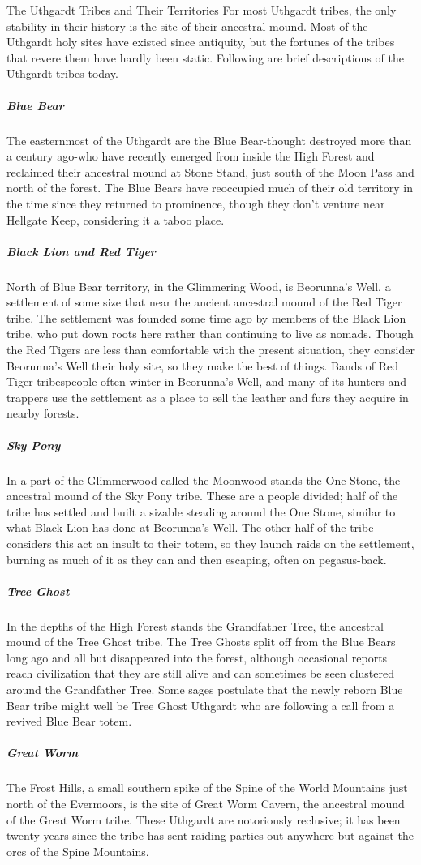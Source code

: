\documentclass[10pt,a4paper,twoside,twocolumn,openany,bg=print,nodeprecatedcode]{dndbook}
\begin{document}
\begin{DndComment}{The Uthgardt Tribes and Their Territories}
For most Uthgardt tribes, the only stability in their history is the site of their ancestral mound. Most of the Uthgardt holy sites have existed since antiquity, but the fortunes of the tribes that revere them have hardly been static. Following are brief descriptions of the Uthgardt tribes today.
\subparagraph{Blue Bear}
The easternmost of the Uthgardt are the Blue Bear-thought destroyed more than a century ago-who have recently emerged from inside the High Forest and reclaimed their ancestral mound at Stone Stand, just south of the Moon Pass and north of the forest. The Blue Bears have reoccupied much of their old territory in the time since they returned to prominence, though they don't venture near Hellgate Keep, considering it a taboo place.
\subparagraph{Black Lion and Red Tiger}
North of Blue Bear territory, in the Glimmering Wood, is Beorunna's Well, a settlement of some size that near the ancient ancestral mound of the Red Tiger tribe. The settlement was founded some time ago by members of the Black Lion tribe, who put down roots here rather than continuing to live as nomads.
Though the Red Tigers are less than comfortable with the present situation, they consider Beorunna's Well their holy site, so they make the best of things. Bands of Red Tiger tribespeople often winter in Beorunna's Well, and many of its hunters and trappers use the settlement as a place to sell the leather and furs they acquire in nearby forests.
\subparagraph{Sky Pony}
In a part of the Glimmerwood called the Moonwood stands the One Stone, the ancestral mound of the Sky Pony tribe. These are a people divided; half of the tribe has settled and built a sizable steading around the One Stone, similar to what Black Lion has done at Beorunna's Well. The other half of the tribe considers this act an insult to their totem, so they launch raids on the settlement, burning as much of it as they can and then escaping, often on pegasus-back.
\subparagraph{Tree Ghost}
In the depths of the High Forest stands the Grandfather Tree, the ancestral mound of the Tree Ghost tribe. The Tree Ghosts split off from the Blue Bears long ago and all but disappeared into the forest, although occasional reports reach civilization that they are still alive and can sometimes be seen clustered around the Grandfather Tree. Some sages postulate that the newly reborn Blue Bear tribe might well be Tree Ghost Uthgardt who are following a call from a revived Blue Bear totem.
\subparagraph{Great Worm}
The Frost Hills, a small southern spike of the Spine of the World Mountains just north of the Evermoors, is the site of Great Worm Cavern, the ancestral mound of the Great Worm tribe. These Uthgardt are notoriously reclusive; it has been twenty years since the tribe has sent raiding parties out anywhere but against the orcs of the Spine Mountains.

\end{DndComment}
\end{document}
